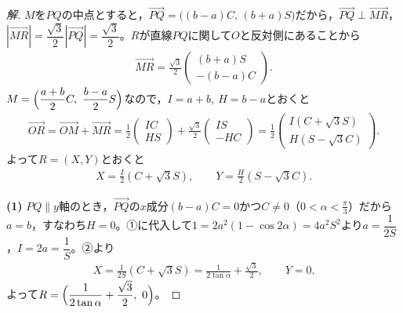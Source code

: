 \documentclass[../main.tex]{subfiles}
\begin{document}
\begin{proof}[解]
  $M$を$PQ$の中点とすると，$\overrightarrow{PQ}=\bigl((b-a)C,\,(b+a)S\bigr)$だから，$\overrightarrow{PQ}\perp\overrightarrow{MR}$，$|\overrightarrow{MR}|=\dfrac{\sqrt3}2|\overrightarrow{PQ}|=\dfrac{\sqrt3}2$。$R$が直線$PQ$に関して$O$と反対側にあることから
  \begin{align*}
    \overrightarrow{MR}=\frac{\sqrt3}2
    \begin{pmatrix}(b+a)S\\-(b-a)C
    \end{pmatrix}.
  \end{align*}
  $M=\Bigl(\dfrac{a+b}2C,\ \dfrac{b-a}2S\Bigr)$なので，$I=a+b,\ H=b-a$とおくと
  \begin{align*}
    \overrightarrow{OR}=\overrightarrow{OM}+\overrightarrow{MR}=\frac12
    \begin{pmatrix}IC\\HS
    \end{pmatrix}+\frac{\sqrt3}2
    \begin{pmatrix}IS\\-HC
    \end{pmatrix}=\frac12
    \begin{pmatrix}I(C+\sqrt3S)\\H(S-\sqrt3C)
    \end{pmatrix}.
  \end{align*}
  よって$R=(X,Y)$とおくと
  \begin{align*}
    X=\frac I2(C+\sqrt3S),\qquad Y=\frac H2(S-\sqrt3C).\tag{②}
  \end{align*}

  \textbf{(1)} $PQ\parallel y$軸のとき，$\overrightarrow{PQ}$の$x$成分$(b-a)C=0$かつ$C\neq0$（$0<\alpha<\frac\pi3$）だから$a=b$，すなわち$H=0$。①に代入して$1=2a^2(1-\cos2\alpha)=4a^2S^2$より$a=\dfrac1{2S}$，$I=2a=\dfrac1S$。②より
  \begin{align*}
    X=\frac1{2S}(C+\sqrt3S)=\frac1{2\tan\alpha}+\frac{\sqrt3}2,\qquad Y=0.
  \end{align*}
  よって$R=\Bigl(\dfrac1{2\tan\alpha}+\dfrac{\sqrt3}2,\ 0\Bigr)$。


\end{proof}
\end{document}
